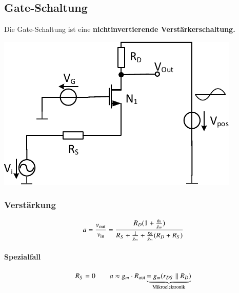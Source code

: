 \subsection{Gate-Schaltung}

Die Gate-Schaltung ist eine \textbf{nichtinvertierende Verstärkerschaltung.}

\smallskip

\begin{minipage}[t]{0.4\columnwidth}
    \includegraphics[width=\columnwidth, align=t]{images/03_gate_schaltung.pdf}
\end{minipage}
\hfill
\begin{minipage}[t]{0.58\columnwidth}
    \subsubsection{Verstärkung}

    \vspace{-0.2cm}

    \[
        a = \frac{v_{\rm out}}{v_{\rm in}} = \frac{R_D (1+\frac{g_0}{g_m})}{R_S + \frac{1}{g_m} + \frac{g_0}{g_m} (R_D + R_S)}
    \]

    \paragraph{Spezialfall}
    
    \vspace{-0.3cm}

    \[
        R_S = 0 \qquad  a \approx g_m \cdot R_{\rm out} \underbrace{= g_m (r_{DS} \parallel R_D) }_{\text{Mikroelektronik}} 
    \]
\end{minipage}

\smallskip

